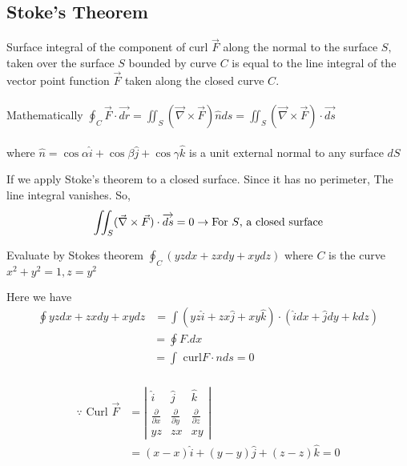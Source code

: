 \subsection{Stoke's  Theorem}
\begin{definition}
Surface integral of the component of curl $\vec{F}$ along the normal to the surface $S,$ taken over the surface $S$ bounded by curve $C$ is equal to the line integral of the vector point function
$\vec{F}$ taken along the closed curve $C$.\\\\ Mathematically $
\oint_{C} \vec{F} \cdot \overrightarrow{d r}=\iint_{S}(\vec{\nabla} \times \vec{F}) \hat{n} d s=\iint_{S}(\vec{\nabla} \times \vec{F}) \cdot \overrightarrow{d s}
$
\\\\where $\hat{n}=\cos \alpha \hat{i}+\cos \beta \hat{j}+\cos \gamma \hat{k}$ is a unit
external normal to any surface $d S$	
\end{definition}
If we apply Stoke's theorem to a closed surface. Since it has no perimeter, The line integral vanishes. So,
$$ \iint_{S}(\vec{\nabla} \times \vec{F})  \cdot \overrightarrow{d s}=0 \rightarrow \text{For $ S $, a closed surface}$$
\begin{exercise}
 Evaluate by Stokes theorem $\oint_{C}(y z d x+z x d y+x y d z)$ where $C$ is the curve $x^{2}+y^{2}=1, z=y^{2}$\end{exercise}
\begin{answer}
	 Here we have
	$$ 
	\begin{aligned}
		\oint y z d x+z x d y+x y d z&=\int(y z \hat{i}+z x \hat{j}+x y \hat{k}) \cdot(\hat{i} d x+\hat{j} d y+k d z)
	\end{aligned}
	$$
	$$
	\begin{aligned}
		=\oint F . d x &  \\
		=\int \text { curl} F\cdot nds  =0  \\
	\end{aligned}
	$$
	
	$$
	\begin{aligned}
		\because
		\text { Curl } \vec{F} &=\left|\begin{array}{lll}
			\hat{i} & \hat{j} & \hat{k} \\
			\frac{\partial}{\partial x} & \frac{\partial}{\partial y} & \frac{\partial}{\partial z} \\
			y z & z x & x y
		\end{array}\right|\\&=(x-x) \hat{i}+(y-y) \hat{j}+(z-z) \hat{k}=0
	\end{aligned}
	$$
	
\end{answer}


